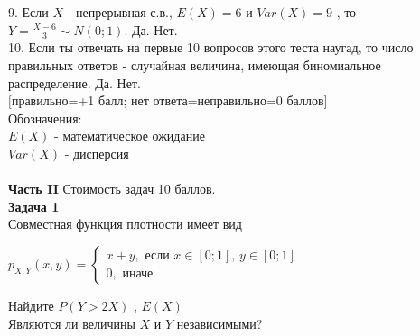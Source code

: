 \documentclass[pdftex,12pt,a4paper]{article}
\begin{document}
9. Если  $X$  - непрерывная с.в.,  $E\left(X\right)=6$  и
$Var\left(X\right)=9$ , то  $Y=\frac{X-6}{3} \sim
N\left(0;1\right)$.  Да. Нет. \\

10. Если ты отвечать на первые 10 вопросов этого теста наугад, то
число правильных ответов - случайная величина, имеющая
биномиальное распределение. Да. Нет. \\



$[$правильно=+1 балл; нет ответа=неправильно=0 баллов$]$ \\
Обозначения: \\
$E(X)$ - математическое ожидание \\
$Var(X)$ - дисперсия \\ \\




\pagebreak \textbf{Часть II} Стоимость задач 10 баллов. \\





\textbf{Задача 1} \\ %
Совместная функция плотности имеет вид

$p_{X,Y} \left(x,y\right)=
\left\{
\begin{array}{l} 
{x+y, \text{ если } x\in \left[0;1\right],\, y\in \left[0;1\right]} \\
{0,\text{ иначе} } 
\end{array}\right. $

Найдите  $P\left(Y>2X\right)$ ,  $E\left(X\right)$ \\
Являются ли величины $X$ и $Y$ независимыми? \\
\end{document}
